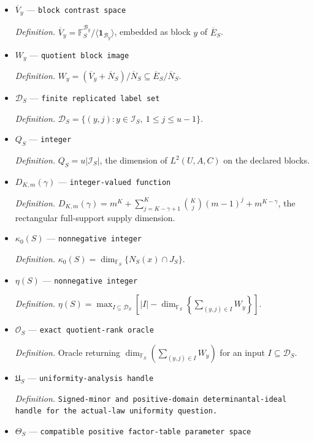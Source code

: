 \documentclass{article}
\begin{document}
\begin{itemize}
  \item \(\overline V_y\) --- \texttt{block contrast space}
  \par\smallskip\noindent\emph{Definition.} \(\overline V_y=\mathbb F_S^{\mathcal B_y}/\langle\mathbf 1_{\mathcal B_y}\rangle\), embedded as block \(y\) of \(\overline E_S\).
  \item \(W_y\) --- \texttt{quotient block image}
  \par\smallskip\noindent\emph{Definition.} \(W_y=(\overline V_y+\overline N_S)/\overline N_S\subseteq\overline E_S/\overline N_S\).
  \item \(\mathcal D_S\) --- \texttt{finite replicated label set}
  \par\smallskip\noindent\emph{Definition.} \(\mathcal D_S=\{(y,j):y\in\mathcal I_S,\ 1\le j\le u-1\}\).
  \item \(Q_S\) --- \texttt{integer}
  \par\smallskip\noindent\emph{Definition.} \(Q_S=u|\mathcal I_S|\), the dimension of \(L^2(U,A,C)\) on the declared blocks.
  \item \(D_{K,m}(\gamma)\) --- \texttt{integer-\allowbreak{}valued function}
  \par\smallskip\noindent\emph{Definition.} \(D_{K,m}(\gamma)=m^K+\sum_{j=K-\gamma+1}^K\binom Kj(m-1)^j+m^{K-\gamma}\), the rectangular full-support supply dimension.
  \item \(\kappa_0(S)\) --- \texttt{nonnegative integer}
  \par\smallskip\noindent\emph{Definition.} \(\kappa_0(S)=\dim_{\mathbb F_S}\{N_S(x)\cap J_S\}\).
  \item \(\eta(S)\) --- \texttt{nonnegative integer}
  \par\smallskip\noindent\emph{Definition.} \(\eta(S)=\max_{I\subseteq\mathcal D_S}\left[|I|-\dim_{\mathbb F_S}\left\{\sum_{(y,j)\in I}W_y\right\}\right]\).
  \item \(\mathcal O_S\) --- \texttt{exact quotient-\allowbreak{}rank oracle}
  \par\smallskip\noindent\emph{Definition.} Oracle returning \(\dim_{\mathbb F_S}(\sum_{(y,j)\in I}W_y)\) for an input \(I\subseteq\mathcal D_S\).
  \item \(\mathfrak U_S\) --- \texttt{uniformity-\allowbreak{}analysis handle}
  \par\smallskip\noindent\emph{Definition.} \texttt{Signed-\allowbreak{}minor and positive-\allowbreak{}domain determinantal-\allowbreak{}ideal handle for the actual-\allowbreak{}law uniformity question.}
  \item \(\Theta_S\) --- \texttt{compatible positive factor-\allowbreak{}table parameter space}

\end{itemize}
\end{document}
